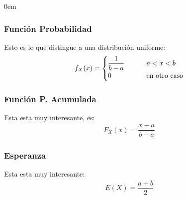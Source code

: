 \documentclass[12pt, fleqn]{report}                             %
\newenvironment{SmallIndentation}[1][0.75em]                    %
        {\begin{adjustwidth}{#1}{}\begin{footnotesize}}             %
        {\end{footnotesize}\end{adjustwidth}}                       %
\DeclareMathOperator \MegaSpace {\quad \quad}                   %
\theoremstyle{break}                                            %
\begin{document}
\begin{multicols}{2}
\begin{SmallIndentation}[0em]
                    \subsubsection{Función Probabilidad}

                        Esto es lo que distingue a una distribución uniforme:
                        \begin{equation*}
                            f_X(x) = 
                                \begin{cases}
                                    \dfrac{1}{b - a}  \MegaSpace &a < x < b           \\
                                    0                 \MegaSpace &$en otro caso$
                                \end{cases}
                        \end{equation*}


                    \subsubsection{Función P. Acumulada}

                        Esta esta muy interesante, es:
                        \begin{align*}
                            F_X(x) = \dfrac{x - a}{b - a}                  
                        \end{align*}


                    \subsubsection{Esperanza}

                        Esta esta muy interesante:
                        \begin{align*}
                            E(X) = \dfrac{a+b}{2}                    
                        \end{align*}


\end{SmallIndentation}
\end{multicols}
\end{document}
